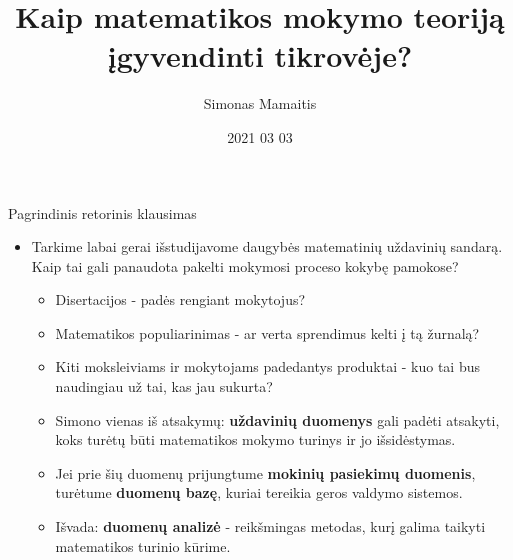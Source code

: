\documentclass[xcolor={dvipsnames}]{beamer}
\title{Kaip matematikos mokymo teoriją įgyvendinti tikrovėje?}
\author{Simonas Mamaitis}
\date{2021 03 03}
\begin{document}
\begin{frame}
  \titlepage
\end{frame}


\begin{frame}[fragile]{Pagrindinis retorinis klausimas}
\begin{itemize}
\item<1-> Tarkime labai gerai išstudijavome daugybės matematinių uždavinių sandarą. Kaip tai gali panaudota pakelti mokymosi proceso kokybę pamokose?
	\begin{itemize}
		\item <2-> Disertacijos - padės rengiant mokytojus?
		\item <3-> Matematikos populiarinimas - ar verta sprendimus kelti į tą žurnalą?
		\item <4-> Kiti moksleiviams ir mokytojams padedantys produktai - kuo tai bus naudingiau už tai, kas jau sukurta? 
		\item <5-> Simono vienas iš atsakymų: \textbf{uždavinių duomenys} gali padėti atsakyti, koks turėtų būti matematikos mokymo turinys ir jo išsidėstymas.
		\item <6-> Jei prie šių duomenų prijungtume \textbf{mokinių pasiekimų duomenis}, turėtume \textbf{duomenų bazę}, kuriai tereikia geros valdymo sistemos.
		\item <7-> Išvada: \textbf{duomenų analizė} - reikšmingas metodas, kurį galima taikyti matematikos turinio kūrime.
	\end{itemize}
\end{itemize}
\end{frame}
\end{document}
